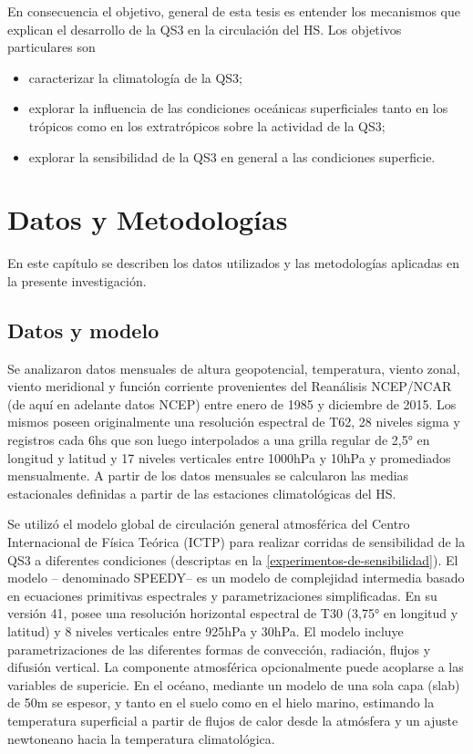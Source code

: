 \documentclass[spanish,a4paper,12pt,oneside]{book}
\providecommand{\tightlist}{%
  \setlength{\itemsep}{0pt}\setlength{\parskip}{0pt}}
\begin{document}
En consecuencia el objetivo, general de esta tesis es entender los
mecanismos que explican el desarrollo de la QS3 en la circulación del
HS. Los objetivos particulares son

\begin{itemize}
\tightlist
\item
  caracterizar la climatología de la QS3;
\item
  explorar la influencia de las condiciones oceánicas superficiales
  tanto en los trópicos como en los extratrópicos sobre la actividad de
  la QS3;
\item
  explorar la sensibilidad de la QS3 en general a las condiciones
  superficie.
\end{itemize}

\hypertarget{datos-y-metodologias}{%
\chapter{Datos y Metodologías}\label{datos-y-metodologias}}

En este capítulo se describen los datos utilizados y las metodologías
aplicadas en la presente investigación.

\hypertarget{datos-y-modelo}{%
\section{Datos y modelo}\label{datos-y-modelo}}

Se analizaron datos mensuales de altura geopotencial, temperatura,
viento zonal, viento meridional y función corriente provenientes del
Reanálisis NCEP/NCAR \citep{Kalnay1996} (de aquí en adelante datos NCEP)
entre enero de 1985 y diciembre de 2015. Los mismos poseen originalmente
una resolución espectral de T62, 28 niveles sigma y registros cada 6hs
que son luego interpolados a una grilla regular de 2,5° en longitud y
latitud y 17 niveles verticales entre 1000hPa y 10hPa y promediados
mensualmente. A partir de los datos mensuales se calcularon las medias
estacionales definidas a partir de las estaciones climatológicas del HS.

Se utilizó el modelo global de circulación general atmosférica del
Centro Internacional de Física Teórica (ICTP)
\citep{Molteni2003, Kucharski2006} para realizar corridas de
sensibilidad de la QS3 a diferentes condiciones (descriptas en la
\autoref{experimentos-de-sensibilidad}). El modelo -- denominado
SPEEDY-- es un modelo de complejidad intermedia basado en ecuaciones
primitivas espectrales y parametrizaciones simplificadas. En su versión
41, posee una resolución horizontal espectral de T30 (3,75° en longitud
y latitud) y 8 niveles verticales entre 925hPa y 30hPa. El modelo
incluye parametrizaciones de las diferentes formas de convección,
radiación, flujos y difusión vertical. La componente atmosférica
opcionalmente puede acoplarse a las variables de supericie. En el
océano, mediante un modelo de una sola capa (slab) de 50m se espesor, y
tanto en el suelo como en el hielo marino, estimando la temperatura
superficial a partir de flujos de calor desde la atmósfera y un ajuste
newtoneano hacia la temperatura climatológica.
\end{document}
